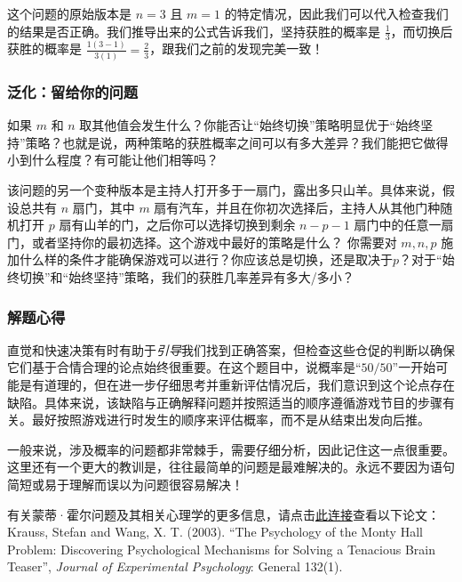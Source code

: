 这个问题的原始版本是 $n = 3$ 且 $m = 1$ 的特定情况，因此我们可以代入检查我们的结果是否正确。我们推导出来的公式告诉我们，坚持获胜的概率是 $\frac{1}{3}$，而切换后获胜的概率是 $\frac{1(3-1)}{3(1)} = \frac{2}{3}$，跟我们之前的发现完美一致！

\subsubsection*{泛化：留给你的问题}

如果 $m$ 和 $n$ 取其他值会发生什么？你能否让``始终切换''策略明显优于``始终坚持''策略？也就是说，两种策略的获胜概率之间可以有多大差异？我们能把它做得小到什么程度？有可能让他们相等吗？

该问题的另一个变种版本是主持人打开多于一扇门，露出多只山羊。具体来说，假设总共有 $n$ 扇门，其中 $m$ 扇有汽车，并且在你初次选择后，主持人从其他门种随机打开 $p$ 扇有山羊的门，之后你可以选择切换到剩余 $n-p-1$ 扇门中的任意一扇门，或者坚持你的最初选择。这个游戏中最好的策略是什么？ 你需要对 $m,n,p$ 施加什么样的条件才能确保游戏可以进行？你应该总是切换，还是取决于$p$？对于``始终切换''和``始终坚持''策略，我们的获胜几率差异有多大/多小？

\subsubsection*{解题心得}

直觉和快速决策有时有助于\textit{引导}我们找到正确答案，但检查这些仓促的判断以确保它们基于合情合理的论点始终很重要。在这个题目中，说概率是``$50/50$''一开始可能是有道理的，但在进一步仔细思考并重新评估情况后，我们意识到这个论点存在缺陷。具体来说，该缺陷与正确解释问题并按照适当的顺序遵循游戏节目的步骤有关。最好按照游戏进行时发生的顺序来评估概率，而不是从结束出发向后推。

一般来说，涉及概率的问题都非常棘手，需要仔细分析，因此记住这一点很重要。这里还有一个更大的教训是，往往最简单的问题是最难解决的。永远不要因为语句简短或易于理解而误以为问题很容易解决！

有关蒙蒂·霍尔问题及其相关心理学的更多信息，请点击\href{http://www.usd.edu/~xtwang/Papers/MontyHallPaper.pdf}{此连接}查看以下论文： Krauss, Stefan and Wang, X. T. (2003). ``The Psychology of the Monty Hall Problem: Discovering Psychological Mechanisms for Solving a Tenacious Brain Teaser'', \textit{Journal of Experimental Psychology}: General 132(1).